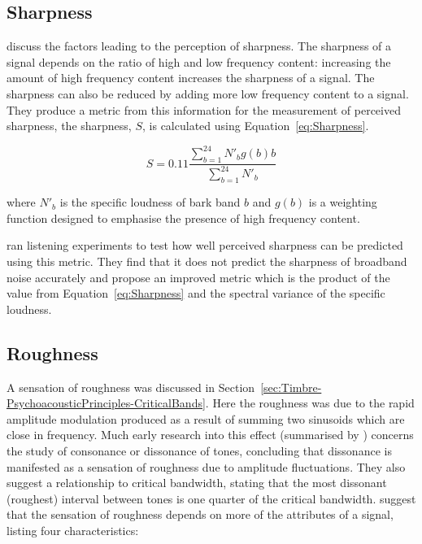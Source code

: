 	\subsection{Sharpness}
	\label{sec:Timbre-TimbralFeatures-Sharpness}
		\citet{fastl2007psychoacoustics} discuss the factors leading to the perception of sharpness. The sharpness
		of a signal depends on the ratio of high and low frequency content: increasing the amount of high frequency
		content increases the sharpness of a signal. The sharpness can also be reduced by adding more low frequency
		content to a signal. They produce a metric from this information for the measurement of perceived
		sharpness, the sharpness, $S$, is calculated using Equation~\ref{eq:Sharpness}.

		\begin{equation}
			S = 0.11\frac{\sum_{b = 1}^{24} N'_{b}g(b)b}{\sum_{b = 1}^{24}N'_{b}}
			\label{eq:Sharpness}
		\end{equation}

		where $N'_{b}$ is the specific loudness of bark band $b$ and $g(b)$ is a weighting function designed to
		emphasise the presence of high frequency content.

		\citet{marui2006predicting} ran listening experiments to test how well perceived sharpness can be predicted
		using this metric. They find that it does not predict the sharpness of broadband noise accurately and
		propose an improved metric which is the product of the value from Equation~\ref{eq:Sharpness} and the
		spectral variance of the specific loudness.

	\subsection{Roughness}
	\label{sec:Timbre-TimbralFeatures-Roughness}
		A sensation of roughness was discussed in Section~\ref{sec:Timbre-PsychoacousticPrinciples-CriticalBands}.
		Here the roughness was due to the rapid amplitude modulation produced as a result of summing two sinusoids
		which are close in frequency. Much early research into this effect (summarised by \citet{plomp1965tonal})
		concerns the study of consonance or dissonance of tones, concluding that dissonance is manifested as a
		sensation of roughness due to amplitude fluctuations. They also suggest a relationship to critical
		bandwidth, stating that the most dissonant (roughest) interval between tones is one quarter of the critical
		bandwidth. \citet{vassilakis2010psychoacoustic} suggest that the sensation of roughness depends on more of
		the attributes of a signal, listing four characteristics:

